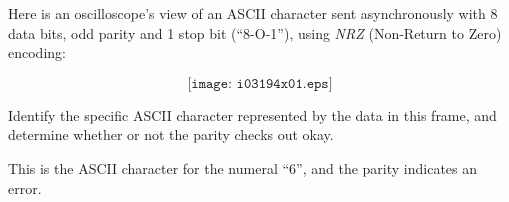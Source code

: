 

Here is an oscilloscope's view of an ASCII character sent asynchronously with 8 data bits, odd parity and 1 stop bit (``8-O-1''), using {\it NRZ} (Non-Return to Zero) encoding:

$$\texttt{[image: i03194x01.eps]}$$

Identify the specific ASCII character represented by the data in this frame, and determine whether or not the parity checks out okay.







This is the ASCII character for the numeral ``6'', and the parity indicates an error.












